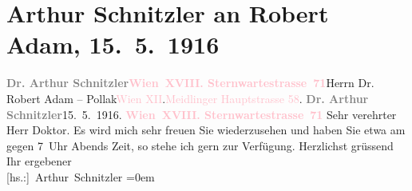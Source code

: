 

               \section[Arthur Schnitzler an Robert Adam, 15. 5. 1916]{ Arthur Schnitzler an Robert Adam, 15. 5. 1916}\nopagebreak{}\rehead{ }\normalsize\beginnumbering{} \toendnotes[C]{\smallbreak\pagebreak[2]} 
\toendnotes[C]{\smallbreak}\pstart{}{\pb}\textcolor{gray}{\textbf{Dr. Arthur Schnitzler}}\pend{}\pstart{}\textcolor{gray}{\textbf{\textcolor{pink}{Wien XVIII. Sternwartestrasse 71}{}\ledrightnote{\textcolor{pink}{Sternwartestraße}}}}\pend{}{\bigskip}\pstart{}{\pb}Herrn Dr. Robert Adam – Pollak\pend{}\pstart{}\textcolor{pink}{Wien XII}{}\ledrightnote{\textcolor{pink}{XII., Meidling}}.\pend{}\pstart{}\textcolor{pink}{Meidlinger Hauptstrasse 58}{}\ledrightnote{\textcolor{pink}{Meidlinger Hauptstraße}}.\pend{}{\bigskip}\pstart
           \noindent{}{\pb}\textcolor{gray}{\textbf{Dr. Arthur Schnitzler}}\hfill 15. 5. 1916.\pend
           \pstart
           \textcolor{gray}{\textbf{\textcolor{pink}{Wien XVIII. Sternwartestrasse 71}{}\ledrightnote{\textcolor{pink}{Sternwartestraße}}}}\pend
           \pstart\center{}Sehr verehrter Herr Doktor.\pend\pstart
           Es wird mich sehr freuen Sie wiederzusehen und haben Sie etwa am \label{K_L02227_1v}\label{K_L02227_1h} gegen 7 Uhr Abends Zeit, so
                    stehe ich gern zur Verfügung.\pend
           \pstart
           Herzlichst grüssend{\\[\baselineskip]}Ihr ergebener{\\[\baselineskip]}\spacefill\mbox{{[}hs.:{]} Arthur Schnitzler}\pend
           \leftskip=0em{}\endnumbering{}  
      